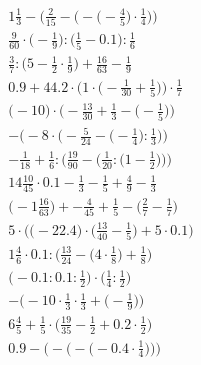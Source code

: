 \documentclass[8pt]{article}
\begin{document}
\begin{align}
1\frac{1}{3} - \bigg(\frac{2}{15} - \Big(-\big(-\frac{4}{5}\big) \cdot \frac{1}{4}\Big)\bigg) \\
\frac{9}{60} \cdot \big(-\frac{1}{9}\big) : \big(\frac{1}{5} - 0.1\big) : \frac{1}{6} \\
\frac{3}{7} : \big(5 - \frac{1}{2} \cdot \frac{1}{9}\big) + \frac{16}{63} - \frac{1}{9} \\
0.9 + 44.2 \cdot \Big(1 \cdot \big(-\frac{1}{30} + \frac{1}{5}\big)\Big) \cdot \frac{1}{7} \\
\Big(-10\Big) \cdot \Big(-\frac{13}{30} + \frac{1}{3} - \big(-\frac{1}{5}\big)\Big) \\
-\bigg(-8 \cdot \Big(-\frac{5}{24} - \big(-\frac{1}{4}\big) : \frac{1}{3}\Big)\bigg) \\
-\frac{1}{18} + \frac{1}{6} : \bigg(\frac{19}{90} - \Big(\frac{1}{20} : \big(1 - \frac{1}{2}\big)\Big)\bigg) \\
14\frac{10}{45} \cdot 0.1 - \frac{1}{3} - \frac{1}{5} + \frac{4}{9} - \frac{1}{3} \\
\big(-1\frac{16}{63}\big) + -\frac{4}{45} + \frac{1}{5} - \big(\frac{2}{7} - \frac{1}{7}\big) \\
5 \cdot \Big(\big(-22.4\big) \cdot \big(\frac{13}{40} - \frac{1}{5}\big) + 5 \cdot 0.1\Big) \\
1\frac{4}{6} \cdot 0.1 : \Big(\frac{13}{24} - \big(4 \cdot \frac{1}{8}\big) + \frac{1}{8}\Big) \\
\big(-0.1 : 0.1 : \frac{1}{2}\big) \cdot \big(\frac{1}{4} : \frac{1}{2}\big) \\
-\Big(-10 \cdot \frac{1}{3} \cdot \frac{1}{3} + \big(-\frac{1}{9}\big)\Big) \\
6\frac{4}{5} + \frac{1}{5} \cdot \big(\frac{19}{35} - \frac{1}{2} + 0.2 \cdot \frac{1}{2}\big) \\
0.9 - \bigg(-\Big(-\big(-0.4 \cdot \frac{1}{4}\big)\Big)\bigg)
\end{align}
\end{document}
